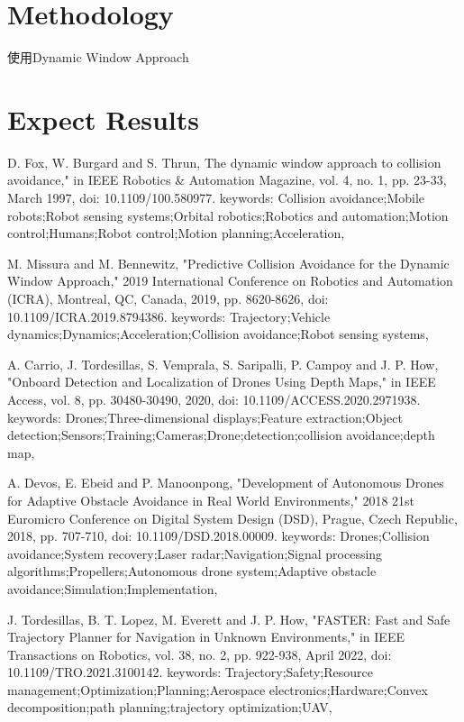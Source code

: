 \documentclass[12pt, a4paper, oneside]{article}
\begin{document}
	\section{Methodology}
	使用Dynamic Window Approach
	\section{Expect Results}
	
	
	\begin{thebibliography}{1}
		
		D. Fox, W. Burgard and S. Thrun, The dynamic window approach to collision avoidance," in IEEE Robotics \& Automation Magazine, vol. 4, no. 1, pp. 23-33, March 1997, doi: 10.1109/100.580977. keywords: {Collision avoidance;Mobile robots;Robot sensing systems;Orbital robotics;Robotics and automation;Motion control;Humans;Robot control;Motion planning;Acceleration},
		
		M. Missura and M. Bennewitz, "Predictive Collision Avoidance for the Dynamic Window Approach," 2019 International Conference on Robotics and Automation (ICRA), Montreal, QC, Canada, 2019, pp. 8620-8626, doi: 10.1109/ICRA.2019.8794386.
		keywords: {Trajectory;Vehicle dynamics;Dynamics;Acceleration;Collision avoidance;Robot sensing systems},
		
		A. Carrio, J. Tordesillas, S. Vemprala, S. Saripalli, P. Campoy and J. P. How, "Onboard Detection and Localization of Drones Using Depth Maps," in IEEE Access, vol. 8, pp. 30480-30490, 2020, doi: 10.1109/ACCESS.2020.2971938.
		keywords: {Drones;Three-dimensional displays;Feature extraction;Object detection;Sensors;Training;Cameras;Drone;detection;collision avoidance;depth map},
		
		A. Devos, E. Ebeid and P. Manoonpong, "Development of Autonomous Drones for Adaptive Obstacle Avoidance in Real World Environments," 2018 21st Euromicro Conference on Digital System Design (DSD), Prague, Czech Republic, 2018, pp. 707-710, doi: 10.1109/DSD.2018.00009. keywords: {Drones;Collision avoidance;System recovery;Laser radar;Navigation;Signal processing algorithms;Propellers;Autonomous drone system;Adaptive obstacle avoidance;Simulation;Implementation},
		
		J. Tordesillas, B. T. Lopez, M. Everett and J. P. How, "FASTER: Fast and Safe Trajectory Planner for Navigation in Unknown Environments," in IEEE Transactions on Robotics, vol. 38, no. 2, pp. 922-938, April 2022, doi: 10.1109/TRO.2021.3100142.
		keywords: {Trajectory;Safety;Resource management;Optimization;Planning;Aerospace electronics;Hardware;Convex decomposition;path planning;trajectory optimization;UAV},
		
		
	\end{thebibliography}
	
\end{document}
